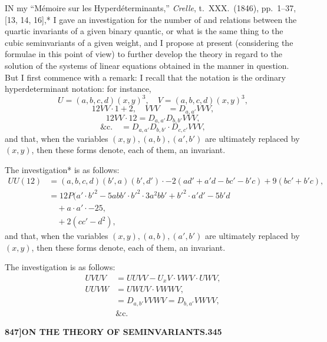 \documentclass[11pt,a4paper]{book}
\begin{document}
\bigskip

\noindent IN my ``M\'emoire sur les Hyperd\'eterminants,'' \textit{Crelle}, t.\ XXX.\ (1846), pp.\ 1--37, [13, 14, 16],* I gave an investigation for the number of and relations between the quartic invariants of a given binary quantic, or what is the same thing to the cubic seminvariants of a given weight, and I propose at present (considering the formulae in this point of view) to further develop the theory in regard to the solution of the systems of linear equations obtained in the manner in question. But I first commence with a remark: I recall that the notation is the ordinary hyperdeterminant notation: for instance,
\[
U = (a, b, c, d)(x, y)^3, \quad V = (a, b, c, d)(x, y)^3,
\]
\[
12VV \cdot 1 + 2,\quad VVV \quad = D_{a,a'} VVV,
\]
\[
12VV \cdot 12 = D_{a,a'} D_{b,b'} VVV,
\]
\[
\&\text{c.}\quad = D_{a,a'} D_{b,b'} \cdot D_{c,c'} VVV,
\]
and that, when the variables $(x, y), (a, b), (a', b')$ are ultimately replaced by $(x, y)$, then these forms denote, each of them, an invariant.

The investigation* is as follows:
\begin{align*}
UU(12) &= (a, b, c, d)(b', a)(b', d') \cdot - 2(ad' + a'd - bc' - b'c) + 9(bc' + b'c), \\
&= 12P(a' \cdot b'^2 - 5abb' \cdot b'^2 \cdot 3a^2bb' + b'^2 \cdot a'd' - 5b'd \\
&\quad + a \cdot a' \cdot - 25, \\
&\quad + 2(cc' - d^2),
\end{align*}
and that, when the variables $(x, y), (a, b), (a', b')$ are ultimately replaced by $(x, y)$, then these forms denote, each of them, an invariant.

The investigation is as follows:
\begin{align*}
UVUV &= UUVV - U_x V \cdot VWV \cdot UWV, \\
UUVW &= UWUV \cdot VWWV, \\
&= D_{a,b'} VVWV = D_{b,a'} VWVV, \\
&\&\text{c.}
\end{align*}


\newpage
\setcounter{page}{345}

\noindent\textbf{847]}\hfill\textbf{ON THE THEORY OF SEMINVARIANTS.}\hfill\textbf{345}

\bigskip
\end{document}
